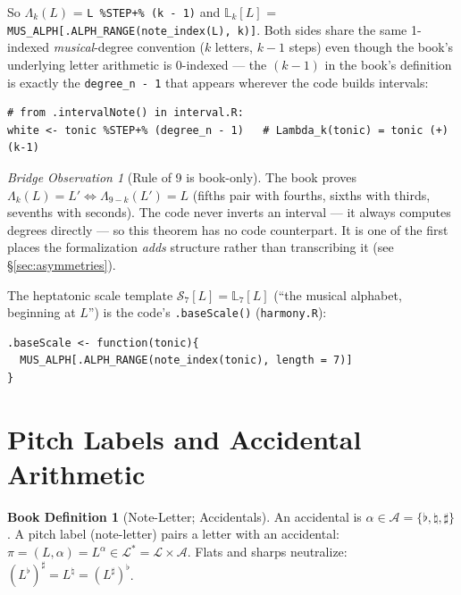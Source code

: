 \documentclass[11pt]{article}
\newcommand{\MAlph}{\mathcal{L}}                 %
\newcommand{\Lstar}{\MAlph^{*}}                  %
\newcommand{\Lam}{\Lambda}                      %
\newcommand{\LSeq}{\mathbb{L}}                  %
\newcommand{\Accset}{\mathcal{A}}               %
\newcommand{\pit}{\pi}                          %
\theoremstyle{definition}
\newtheorem{bookdef}{Book Definition}[section]
\theoremstyle{remark}
\newtheorem{bridge}{Bridge Observation}[section]
\newcommand{\code}[1]{\texttt{#1}}
\newcommand{\file}[1]{\texttt{#1}}
\begin{document}
So $\Lam_k(L)$ = \code{L \%STEP+\% (k - 1)} and
$\LSeq_k[L]$ = \code{MUS\_ALPH[.ALPH\_RANGE(note\_index(L), k)]}. Both sides
share the same 1-indexed \emph{musical}-degree convention ($k$ letters, $k-1$
steps) even though the book's underlying letter arithmetic is 0-indexed --- the
$(k-1)$ in the book's definition is exactly the \code{degree\_n - 1} that appears
wherever the code builds intervals:

\begin{lstlisting}
# from .intervalNote() in interval.R:
white <- tonic %STEP+% (degree_n - 1)   # Lambda_k(tonic) = tonic (+) (k-1)
\end{lstlisting}

\begin{bridge}[Rule of 9 is book-only]
The book proves $\Lam_k(L) = L' \iff \Lam_{9-k}(L') = L$ (fifths pair with
fourths, sixths with thirds, sevenths with seconds). The code never inverts an
interval --- it always computes degrees directly --- so this theorem has no code
counterpart. It is one of the first places the formalization \emph{adds}
structure rather than transcribing it (see \S\ref{sec:asymmetries}).
\end{bridge}

The heptatonic scale template $\mathcal{S}_7[L] = \LSeq_7[L]$ (``the musical
alphabet, beginning at $L$'') is the code's \code{.baseScale()}
(\file{harmony.R}):

\begin{lstlisting}
.baseScale <- function(tonic){
  MUS_ALPH[.ALPH_RANGE(note_index(tonic), length = 7)]
}
\end{lstlisting}

\section{Pitch Labels and Accidental Arithmetic}\label{sec:accidentals}

\begin{bookdef}[Note-Letter; Accidentals]
An accidental is $\alpha \in \Accset = \{\flat, \natural, \sharp\}$. A pitch
label (note-letter) pairs a letter with an accidental:
$\pit = (L, \alpha) = L^{\alpha} \in \Lstar = \MAlph \times \Accset$. Flats and
sharps neutralize: $(L^{\flat})^{\sharp} = L^{\natural} = (L^{\sharp})^{\flat}$.
\end{bookdef}
\end{document}
